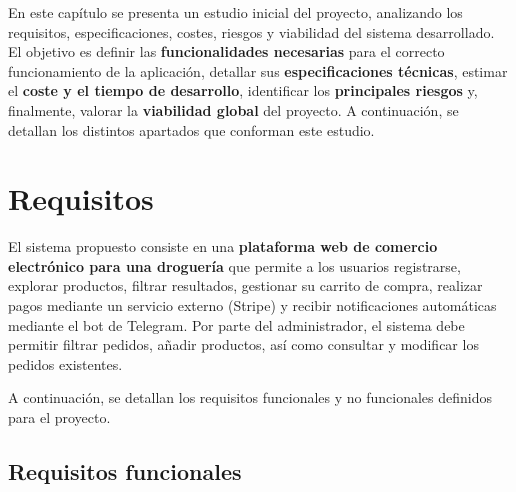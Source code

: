 En este capítulo se presenta un estudio inicial del proyecto, analizando los requisitos, especificaciones, costes, riesgos y viabilidad del sistema desarrollado. 
El objetivo es definir las \textbf{funcionalidades necesarias} para el correcto funcionamiento de la aplicación, detallar sus \textbf{especificaciones técnicas}, estimar el \textbf{coste y el tiempo de desarrollo}, identificar los \textbf{principales riesgos} y, finalmente, valorar la \textbf{viabilidad global} del proyecto. A continuación, se detallan los distintos apartados que conforman este estudio.

\section{Requisitos}

El sistema propuesto consiste en una \textbf{plataforma web de comercio electrónico para una droguería} que permite a los usuarios registrarse, explorar productos, filtrar resultados, gestionar su carrito de compra, realizar pagos mediante un servicio externo (Stripe) y recibir notificaciones automáticas mediante el bot de Telegram. 
Por parte del administrador, el sistema debe permitir filtrar pedidos, añadir productos, así como consultar y modificar los pedidos existentes.

A continuación, se detallan los requisitos funcionales y no funcionales definidos para el proyecto.

\subsection{Requisitos funcionales}

